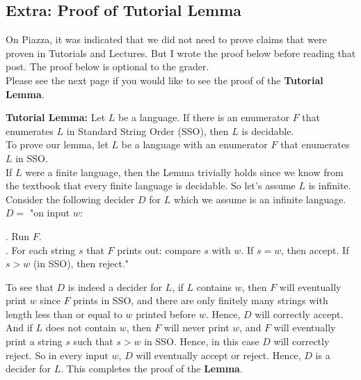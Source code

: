 \documentclass[12pt]{article}
\begin{document}
\subsection*{Extra: Proof of Tutorial Lemma}

On Piazza, it was indicated that we did not need to prove claims that were proven in Tutorials and Lectures. But I wrote the proof below before reading that post. The proof below is optional to the grader. \\

Please see the next page if you would like to see the proof of the \textbf{Tutorial Lemma}.

\newpage

\textbf{Tutorial Lemma:} Let $L$ be a language. If there is an enumerator $F$ that enumerates $L$ in Standard String Order (SSO), then $L$ is decidable. \\

To prove our lemma, let $L$ be a language with an enumerator $F$ that enumerates $L$ in SSO. \\

If $L$ were a finite language, then the Lemma trivially holds since we know from the textbook that every finite language is decidable. So let's assume $L$ is infinite. \\

Consider the following decider $D$ for $L$ which we assume is an infinite language. \\

$D = $ "on input $w$: \\

\setlength\parindent{15pt}

. Run $F$. \\

. For each string $s$ that $F$ prints out: compare $s$ with $w$. If $s = w$, then accept. If $s > w$ (in SSO), then reject." \\

\setlength\parindent{0pt}

To see that $D$ is indeed a decider for $L$, if $L$ contains $w$, then $F$ will eventually print $w$ since $F$ prints in SSO, and there are only finitely many strings with length less than or equal to $w$ printed before $w$. Hence, $D$ will correctly accept. And if $L$ does not contain $w$, then $F$ will never print $w$, and $F$ will eventually print a string $s$ such that $s > w$ in SSO. Hence, in this case $D$ will correctly reject. So in every input $w$, $D$ will eventually accept or reject. Hence, $D$ is a decider for $L$. This completes the proof of the \textbf{Lemma}. 
\end{document}
